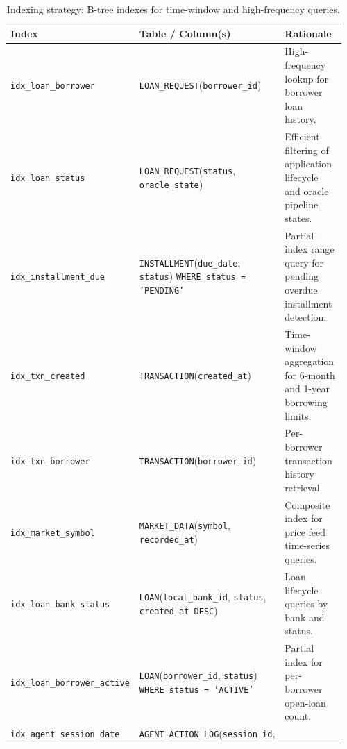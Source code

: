 \documentclass[12pt,a4paper]{report}
\newcommand{\tableheadcolor}{\rowcolor{TableHeadBg}}
\begin{document}
\begin{table}[H]
\centering
\caption[Indexing strategy]{Indexing strategy: B-tree indexes for time-window and high-frequency queries.}
\label{tab:indexing-strategy}
\begingroup
\footnotesize
\setlength{\tabcolsep}{4pt}
\renewcommand{\arraystretch}{1.2}
\begin{tabular}{@{}%
  >{\raggedright\arraybackslash}p{0.19\linewidth}%
  >{\raggedright\arraybackslash}p{0.41\linewidth}%
  >{\raggedright\arraybackslash}p{0.36\linewidth}@{}}
\toprule
\tableheadcolor
\textbf{Index} & \textbf{Table / Column(s)} & \textbf{Rationale} \\
\midrule
\texttt{idx\_loan\_borrower} &
  \texttt{LOAN\_REQUEST}(\texttt{borrower\_id}) &
  High-frequency lookup for borrower loan history. \\
\texttt{idx\_loan\_status} &
  \texttt{LOAN\_REQUEST}(\texttt{status}, \texttt{oracle\_state}) &
  Efficient filtering of application lifecycle and oracle pipeline states. \\
\texttt{idx\_installment\_due} &
  \texttt{INSTALLMENT}(\texttt{due\_date}, \texttt{status})\newline
  \texttt{WHERE status = 'PENDING'} &
  Partial-index range query for pending overdue installment detection. \\
\texttt{idx\_txn\_created} &
  \texttt{TRANSACTION}(\texttt{created\_at}) &
  Time-window aggregation for 6-month and 1-year borrowing limits. \\
\texttt{idx\_txn\_borrower} &
  \texttt{TRANSACTION}(\texttt{borrower\_id}) &
  Per-borrower transaction history retrieval. \\
\texttt{idx\_market\_symbol} &
  \texttt{MARKET\_DATA}(\texttt{symbol},\newline
  \texttt{recorded\_at}) &
  Composite index for price feed time-series queries. \\
\texttt{idx\_loan\_bank\_status} &
  \texttt{LOAN}(\texttt{local\_bank\_id}, \texttt{status},\newline
  \texttt{created\_at DESC}) &
  Loan lifecycle queries by bank and status. \\
\texttt{idx\_loan\_borrower\_active} &
  \texttt{LOAN}(\texttt{borrower\_id}, \texttt{status})\newline
  \texttt{WHERE status = 'ACTIVE'} &
  Partial index for per-borrower open-loan count. \\
\texttt{idx\_agent\_session\_date} &
  \texttt{AGENT\_ACTION\_LOG}(\texttt{session\_id},\newline

\end{tabular}
\end{table}
\end{document}
